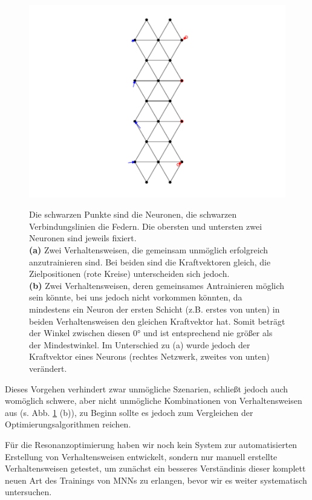 \documentclass[10pt]{scrartcl}
\begin{document}
\begin{figure}[htb]
{{    \includegraphics[trim=6cm 0.75cm 6cm 0.75cm, clip]{bilder/impossibleC.pdf}
    }
    }
    \caption{Die schwarzen Punkte sind die Neuronen, die schwarzen Verbindungslinien die Federn. Die obersten und untersten zwei Neuronen sind jeweils fixiert.\\ 
    \textbf{(a)} Zwei Verhaltensweisen, die gemeinsam unmöglich erfolgreich anzutrainieren sind. Bei beiden sind die Kraftvektoren gleich, die Zielpositionen (rote Kreise) unterscheiden sich jedoch. \\
    \textbf{(b)} Zwei Verhaltensweisen, deren gemeinsames Antrainieren möglich sein könnte, bei uns jedoch nicht vorkommen könnten, da mindestens ein Neuron der ersten Schicht (z.B. erstes von unten) in beiden Verhaltensweisen den gleichen Kraftvektor hat. Somit beträgt der Winkel zwischen diesen \ang{0} und ist entsprechend nie größer als der Mindestwinkel. Im Unterschied zu (a) wurde jedoch der Kraftvektor eines Neurons (rechtes Netzwerk, zweites von unten) verändert.}
    \label{fig:impossibletraining}
\end{figure}

Dieses Vorgehen verhindert zwar unmögliche Szenarien, schließt jedoch auch womöglich schwere, aber nicht unmögliche Kombinationen von Verhaltensweisen aus (s. Abb. \ref{fig:impossibletraining} (b)), 
zu Beginn sollte es jedoch zum Vergleichen der Optimierungsalgorithmen reichen.

Für die Resonanzoptimierung haben wir noch kein System zur automatisierten Erstellung von Verhaltensweisen entwickelt, sondern nur manuell erstellte Verhaltensweisen getestet, um zunächst ein besseres Verständinis dieser komplett neuen Art des Trainings von MNNs zu erlangen, bevor wir es weiter systematisch untersuchen.
\end{document}
